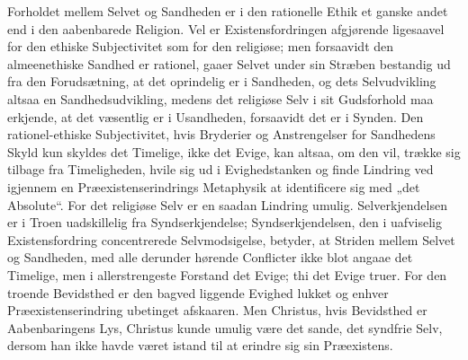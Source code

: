 \documentclass[12pt]{book}
\begin{document}
Forholdet mellem Selvet og Sandheden er i den rationelle Ethik et
ganske andet end i den aabenbarede Religion. Vel er
Existensfordringen afgjørende ligesaavel for den ethiske
Subjectivitet som for den religiøse; men forsaavidt den
almeenethiske Sandhed er rationel, gaaer Selvet under sin Stræben
bestandig ud fra den Forudsætning, at det oprindelig er i Sandheden,
og dets Selvudvikling altsaa en Sandhedsudvikling, medens det
religiøse Selv i sit Gudsforhold maa erkjende, at det væsentlig er i
Usandheden, forsaavidt det er i Synden. Den rationel-ethiske
Subjectivitet, hvis Bryderier og Anstrengelser for Sandhedens Skyld
kun skyldes det Timelige, ikke det Evige, kan altsaa, om den vil,
trække sig tilbage fra Timeligheden, hvile sig ud i Evighedstanken og
finde Lindring ved igjennem en Præexistenserindrings Metaphysik at
identificere sig med „det Absolute“. For det religiøse Selv er en
saadan Lindring umulig. Selverkjendelsen er i
Troen uadskillelig fra Syndserkjendelse; Syndserkjendelsen, den i
uafviselig Existensfordring concentrerede Selvmodsigelse, betyder, at
Striden mellem Selvet og Sandheden, med alle derunder hørende
Conflicter ikke blot angaae det Timelige, men i allerstrengeste
Forstand det Evige; thi det Evige truer. For den troende Bevidsthed
er den bagved liggende Evighed lukket og enhver Præexistenserindring
ubetinget afskaaren. Men Christus, hvis Bevidsthed er Aabenbaringens
Lys, Christus kunde umulig være det sande, det syndfrie Selv, dersom
han ikke havde været istand til at erindre sig sin Præexistens.
\end{document}
